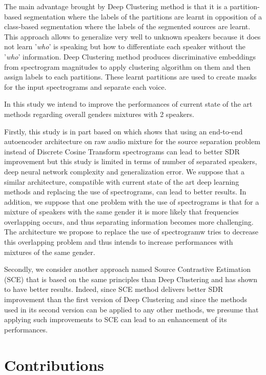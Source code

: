 \documentclass[master, tikz, final,11pt, dvipdfmx]{iscs-thesis}
\begin{document}
The main advantage brought by Deep Clustering \cite{DPCLV1} method is that it is a partition-based segmentation where the labels of the partitions are learnt in opposition of a class-based segmentation where the labels of the segmented sources are learnt. This approach allows to generalize very well to unknown speakers because it does not learn '\textit{who}' is speaking but how to differentiate each speaker without the '\textit{who}' information. Deep Clustering method produces discriminative embeddings from spectrogram magnitudes to apply clustering algorithm on them and then assign labels to each partitions. These learnt partitions are used to create masks for the input spectrograms and separate each voice.

In this study we intend to improve the performances of current state of the art methods regarding overall genders mixtures with 2 speakers.

Firstly, this study is in part based on \cite{Adaptive} which shows that using an end-to-end autoencoder architecture on raw audio mixture for the source separation problem instead of Discrete Cosine Transform spectrograms can lead to better SDR improvement but this study is limited in terms of number of separated speakers, deep neural network complexity and generalization error. We suppose that a similar architecture, compatible with current state of the art deep learning methods and replacing the use of spectrograms, can lead to better results. In addition, we suppose that one problem with the use of spectrograms is that for a mixture of speakers with the same gender it is more likely that frequencies overlapping occurs, and thus separating information becomes more challenging. The architecture we propose to replace the use of spectrogramw tries to decrease this overlapping problem and thus intends to increase performances with mixtures of the same gender. 

Secondly, we consider another approach named Source Contrastive Estimation (SCE) \cite{SCE} that is based on the same principles than Deep Clustering and has shown to have better results. Indeed, since SCE method delivers better SDR improvement than the first version of Deep Clustering \cite{DPCLV1} and since the methods used in its second version \cite{DPCLV2} can be applied to any other methods, we presume that applying such improvements to SCE can lead to an enhancement of its performances.


\section{Contributions}
\label{contrib}
\end{document}
